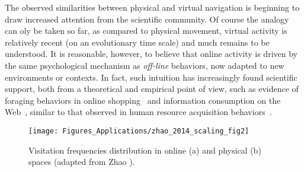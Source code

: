 The observed similarities between physical and virtual navigation is beginning to draw increased attention from the scientific community. Of course the analogy can oly be taken so far, as compared to physical movement, virtual activity is relatively recent (on an evolutionary time scale) and much remains to be understood. It is reasonable, however, to believe that online activity is driven by the same psychological mechanism as \emph{off-line} behaviors, now adapted to new environments or contexts. In fact, such intuition has increasingly found scientific support, both from a theoretical and empirical point of view, such as evidence of foraging behaviors in online shopping~\cite{hantula_2008_online} and information consumption on the Web~\cite{pirolli_1999_information,stenstrom_2008_online}, similar to that observed in human resource acquisition behaviors~\cite{stephens_2007_foraging}.

\begin{figure}[t!]
\centering
\texttt{[image: Figures\_Applications/zhao\_2014\_scaling\_fig2]}
\caption{Visitation frequencies distribution in online (a) and physical (b) spaces (adapted from Zhao \et \cite{zhao_2014_scaling}). }
\label{fig:zhao2014scalingfig2}
\end{figure}


